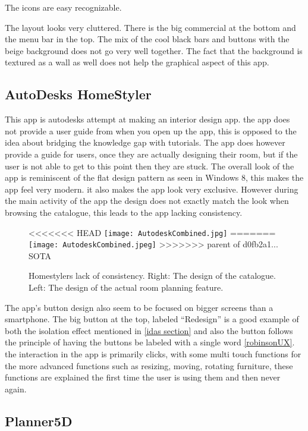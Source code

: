 The icons are easy recognizable.  

The layout looks very cluttered. There is the big commercial at the bottom and the menu bar in the top. 
The mix of the cool black bars and buttons with the beige background does not go very well together. The fact that the background is textured as a wall as well does not help the graphical aspect of this app. 

\subsection{AutoDesks HomeStyler}
This app is autodesks attempt at making an interior design app. the app does not provide a user  guide  from when you open up the app, this is opposed to the idea about bridging the knowledge gap with tutorials. The app does 
however provide a guide for users, once they are actually designing their room, but if the user is not able to get 
to this point then they are stuck. The overall look of the app is reminiscent of the flat design pattern as seen 
in Windows 8, this makes the app feel very modern. it also makes the app look very exclusive. However during the 
main activity of the app the design does not exactly match the look when browsing the catalogue, this leads to the 
app lacking consistency. 

\begin{figure}[H]
\centering
<<<<<<< HEAD
\texttt{[image: AutodeskCombined.jpg]}
=======
\texttt{[image: AutodeskCombined.jpeg]}
>>>>>>> parent of d0fb2a1... SOTA
\caption{Homestylers lack of consistency. Right: The design of the catalogue. Left: The design of the actual room planning feature.}
\end{figure}

The app’s button design also seem to be focused on bigger screens than a smartphone. The 
big button at the top, labeled “Redesign” is a good example of both the isolation effect mentioned in \ref{idas 
section} and also the button follows the principle of having the buttons be labeled with a single word 
\ref{robinsonUX}. the interaction in the app is primarily clicks, with some multi touch functions for the more 
advanced functions such as resizing, moving, rotating furniture, these functions are explained the first time the 
user is using them and then never again.

\subsection{Planner5D}

